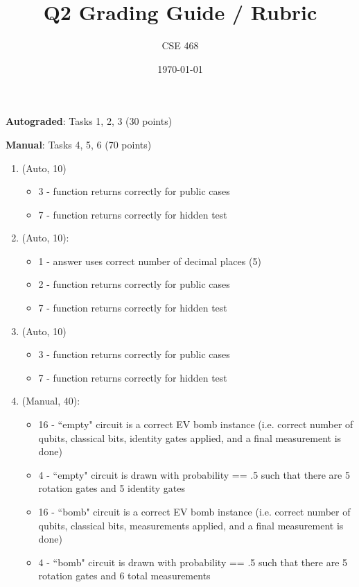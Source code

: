 \documentclass[12pt]{article}
\title{Q2 Grading Guide / Rubric}
\author{CSE 468}
\date{\today}
\begin{document}
\maketitle

\noindent \textbf{Autograded}: Tasks 1, 2, 3 (30 points) 

\noindent \textbf{Manual}: Tasks 4, 5, 6 (70 points)

\begin{enumerate}[font=\bfseries]
    \item (Auto, 10) 
    \begin{itemize}
        \item 3 - function returns correctly for public cases
        \item 7 - function returns correctly for hidden test
    \end{itemize}
    \item (Auto, 10):
    \begin{itemize}
        \item 1 - answer uses correct number of decimal places (5)
        \item 2 - function returns correctly for public cases
        \item 7 - function returns correctly for hidden test
    \end{itemize}
    \item (Auto, 10)
    \begin{itemize}
        \item 3 - function returns correctly for public cases
        \item 7 - function returns correctly for hidden test
    \end{itemize}
    \item (Manual, 40):
    \begin{itemize}
        \item 16 - ``empty" circuit is a correct EV bomb instance (i.e. correct number of qubits, classical bits, identity gates applied, and a final measurement is done)
        \item 4 - ``empty" circuit is drawn with probability == .5 such that there are 5 rotation gates and 5 identity gates
        \item 16 - ``bomb" circuit is a correct EV bomb instance (i.e. correct number of qubits, classical bits, measurements applied, and a final measurement is done)
        \item 4 - ``bomb" circuit is drawn with probability == .5 such that there are 5 rotation gates and 6 total measurements

\end{itemize}
\end{enumerate}
\end{document}
